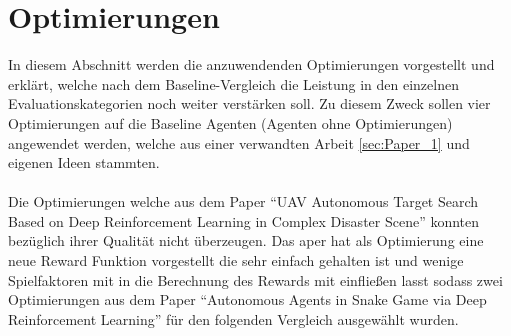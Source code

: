 \section{Optimierungen}
In diesem Abschnitt werden die anzuwendenden Optimierungen vorgestellt und erklärt, welche nach dem Baseline-Vergleich die Leistung in den einzelnen Evaluationskategorien noch weiter verstärken soll. Zu diesem Zweck sollen vier Optimierungen auf die Baseline Agenten (Agenten ohne Optimierungen) angewendet werden, welche aus einer verwandten Arbeit \ref{sec:Paper_1} und eigenen Ideen stammten.\\
\\ Die Optimierungen welche aus dem Paper "`UAV Autonomous Target Search Based on Deep Reinforcement Learning in Complex Disaster Scene"' \cite{UAV} konnten bezüglich ihrer Qualität nicht überzeugen. Das aper hat als Optimierung eine neue Reward Funktion vorgestellt die sehr einfach gehalten ist und wenige Spielfaktoren mit in die Berechnung des Rewards mit einfließen lasst  sodass zwei Optimierungen aus dem Paper "`Autonomous Agents in Snake Game via Deep Reinforcement Learning"' \cite{Autonomous_Agents_in_Snake_Game_via_DRL} für den folgenden Vergleich ausgewählt wurden.

